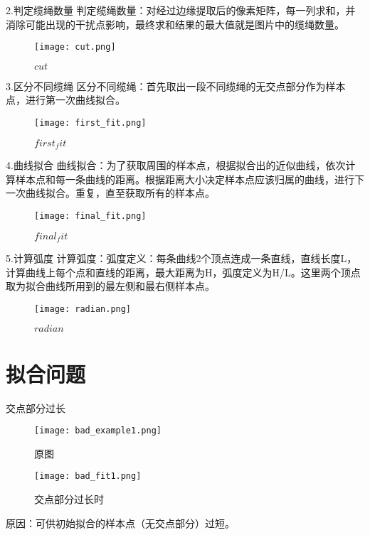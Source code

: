\documentclass[10pt]{beamer}
\begin{document}
\begin{frame}{2.判定缆绳数量}
判定缆绳数量：对经过边缘提取后的像素矩阵，每一列求和，并消除可能出现的干扰点影响，最终求和结果的最大值就是图片中的缆绳数量。
\begin{figure}
  \centerline{\texttt{[image: cut.png]}}
  \caption{$cut$}
\end{figure}
\end{frame}

\begin{frame}{3.区分不同缆绳}
区分不同缆绳：首先取出一段不同缆绳的无交点部分作为样本点，进行第一次曲线拟合。
\begin{figure}
  \centerline{\texttt{[image: first\_fit.png]}}
  \caption{$first_fit$}
\end{figure}
\end{frame}


\begin{frame}{4.曲线拟合}
曲线拟合：为了获取周围的样本点，根据拟合出的近似曲线，依次计算样本点和每一条曲线的距离。根据距离大小决定样本点应该归属的曲线，进行下一次曲线拟合。重复，直至获取所有的样本点。
\begin{figure}
  \centerline{\texttt{[image: final\_fit.png]}}
  \caption{$final_fit$}
\end{figure}
\end{frame}

\begin{frame}{5.计算弧度}
计算弧度：弧度定义：每条曲线2个顶点连成一条直线，直线长度L，计算曲线上每个点和直线的距离，最大距离为H，弧度定义为H/L。这里两个顶点取为拟合曲线所用到的最左侧和最右侧样本点。
\begin{figure}
  \centerline{\texttt{[image: radian.png]}}
  \caption{$radian$}
\end{figure}
\end{frame}


\section{拟合问题}
\begin{frame}{交点部分过长}
\begin{figure}[H]
\begin{minipage}{0.48\linewidth}
  \centerline{\texttt{[image: bad\_example1.png]}}
  \caption{原图}
\end{minipage}
\hfill
\begin{minipage}{0.48\linewidth}
  \centerline{\texttt{[image: bad\_fit1.png]}}
  \caption{交点部分过长时}
\end{minipage}
\end{figure}

原因：可供初始拟合的样本点（无交点部分）过短。
\end{frame}
\end{document}

